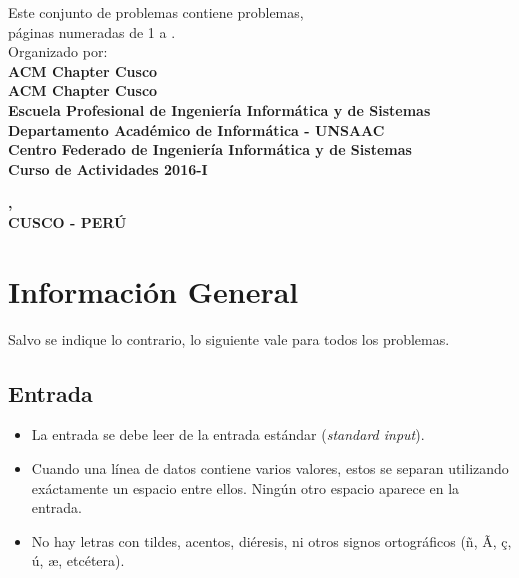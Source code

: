 \documentclass[12pt,oneside,a4paper]{book}
\theoremstyle{definition}
\begin{document}
\begin{center}
\begin{minipage}{\linewidth}
\large
\begin{minipage}{0.45\linewidth}
\end{minipage}
\hspace{0.28\linewidth}
\begin{minipage}{0.8\linewidth}
\begin{normalsize}
Este conjunto de problemas contiene \CusContestNumberProblems problemas,\\ páginas numeradas de 1 a \CusContestNumberPages.\vspace*{0.5in}
\\Organizado por:\vspace*{-0.05in}
\\\textbf{ACM Chapter Cusco}
\\\textbf{ACM Chapter Cusco}
\\\textbf{Escuela Profesional de Ingeniería Informática y de Sistemas}
\\\textbf{Departamento Académico de Informática - UNSAAC}
\\\textbf{Centro Federado de Ingeniería Informática y de Sistemas}
\\\textbf{Curso de Actividades 2016-I}
\\
\end{normalsize}
\end{minipage}
\end{minipage}
\vspace*{0.6in}
{
\textbf{\CusContestDateMonth \CusContestDateDay, \CusContestDateYear}\\ \vspace*{-0.6in}
\textbf{CUSCO - PERÚ}
}
\end{center}

\newpage 
\section*{Información General}
Salvo se indique lo contrario, lo siguiente vale para todos los problemas.

\subsection*{Entrada}
\begin{itemize}
  \item La entrada se debe leer de la entrada estándar (\textit{standard input}).
  \item Cuando una línea de datos contiene varios valores, estos se separan utilizando exáctamente un espacio entre ellos. Ningún otro espacio aparece en la entrada.
  \item No hay letras con tildes, acentos, diéresis, ni otros signos ortográficos (ñ, \~A, ç, ú, æ, etcétera).
\end{itemize}
\end{document}
